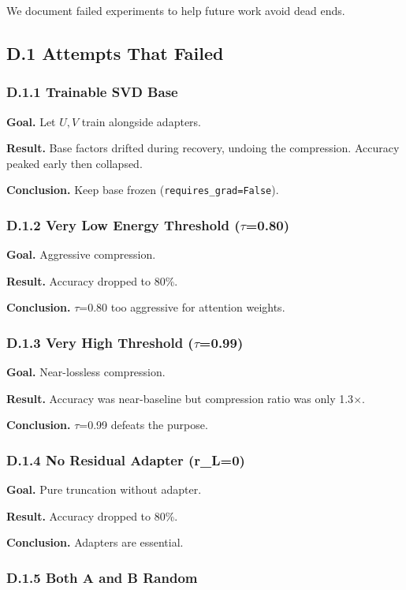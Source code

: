 We document failed experiments to help future work avoid dead ends.

\subsection{D.1 Attempts That Failed}

\subsubsection{D.1.1 Trainable SVD Base}

\textbf{Goal.} Let $U, V$ train alongside adapters.

\textbf{Result.} Base factors drifted during recovery, undoing the compression. 
Accuracy peaked early then collapsed.

\textbf{Conclusion.} Keep base frozen (\texttt{requires\_grad=False}).

\subsubsection{D.1.2 Very Low Energy Threshold ($\tau$=0.80)}

\textbf{Goal.} Aggressive compression.

\textbf{Result.} Accuracy dropped to 80\%.

\textbf{Conclusion.} $\tau$=0.80 too aggressive for attention weights.

\subsubsection{D.1.3 Very High Threshold ($\tau$=0.99)}

\textbf{Goal.} Near-lossless compression.

\textbf{Result.} Accuracy was near-baseline but compression ratio was only 
1.3$\times$.

\textbf{Conclusion.} $\tau$=0.99 defeats the purpose.

\subsubsection{D.1.4 No Residual Adapter (r\_L=0)}

\textbf{Goal.} Pure truncation without adapter.

\textbf{Result.} Accuracy dropped to 80\%.

\textbf{Conclusion.} Adapters are essential.

\subsubsection{D.1.5 Both A and B Random}

